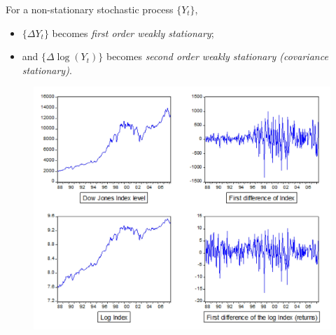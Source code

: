 \documentclass[11pt]{article}
\begin{document}
		\begin{proposition}[Transformations]
			For a non-stationary stochastic process $\{Y_t\}$,
			\begin{itemize}
				\item $\{\Delta Y_t\}$ becomes \emph{first order weakly stationary};
				\item and $\{\Delta \log(Y_t)\}$ becomes \emph{second order weakly stationary (covariance stationary)}.
			\end{itemize}
			\begin{figure}[h]
				\centering
				\includegraphics{figures/2_1}
			\end{figure}
		\end{proposition}
		
		
\end{document}
